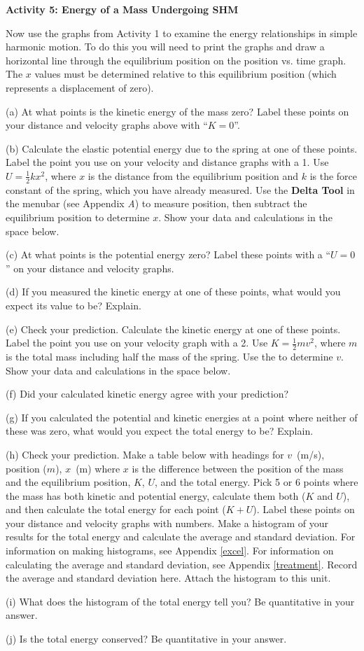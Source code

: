 \textbf{Activity 5: Energy of a Mass Undergoing SHM }

Now use the graphs from Activity 1 to examine the energy relationships
in simple harmonic motion. To do this you will need to print the graphs and draw a horizontal line through the equilibrium position on the position vs. time graph.  
The $x$ values must be determined relative to this equilibrium position (which represents a displacement of zero).

(a) At what points is the kinetic energy of the mass zero? Label these points
on your distance and velocity graphs above with ``$K=0$''.

\pagebreak[2]
(b) Calculate the elastic potential energy due to the spring at one of these
points. Label the point you use on your velocity and distance graphs with a
1. Use $U = \frac{1}{2}kx^{2}$, where  $x$ is the distance from the equilibrium 
position and $k$ is the force constant of the spring, which you have already 
measured. Use the \textbf{Delta Tool} in the menubar (see Appendix {\it A})
to measure position, then subtract the 
equilibrium position to determine $x$. Show your data and calculations 
in the space below. 
\answerspace{20mm}

(c) At what points is the potential energy zero? Label these points with a ``$U=0$''
on your distance and velocity graphs.

(d) If you measured the kinetic energy at one of these points, what would you
expect its value to be? Explain.
\answerspace{15mm}

\pagebreak[2]
(e) Check your prediction. Calculate the kinetic energy at one of these points.
Label the point you use on your velocity graph with a 2. Use 
$K = \frac{1}{2} mv^{2}$, where $m$ is the total mass including half the mass of 
the spring. Use the  to determine $v$. Show your data and 
calculations in the space below.
\answerspace{20mm}

(f) Did your calculated kinetic energy agree with your prediction?
\answerspace{15mm}

(g) If you calculated the potential and kinetic energies at a point where 
neither of these was zero, what would you expect the total energy to be? 
Explain.
\answerspace{20mm}

\pagebreak[3]
(h) Check your prediction. Make a table below with headings for $v$~(m/s), 
position ($m$), $x$~(m) where $x$ is the difference between the position
of the mass and the equilibrium position, $K$, $U$, and the total energy.
Pick 5 or 6 points where the mass has both kinetic and
potential energy, calculate them both ($K$ and $U$), and then calculate the 
total energy for each point ($K+U$). Label these points on your distance
and velocity graphs with numbers. 
Make a histogram of your results for the total energy and calculate the 
average and standard deviation.
For information on making histograms, see Appendix \ref{excel}. For information 
on calculating the average and standard deviation, see Appendix \ref{treatment}. 
Record the average and standard deviation here.
Attach the histogram to this unit.
\answerspace{80mm}

(i) What does the histogram of the total energy tell you? Be quantitative in 
your answer.
\answerspace{20mm}

(j) Is the total energy conserved?  Be quantitative in your answer.
\answerspace{20mm}

